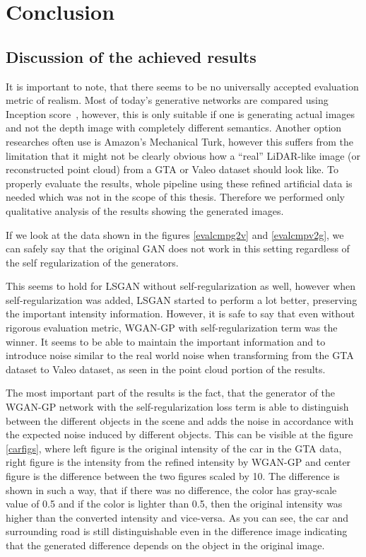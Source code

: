 \chapter{Conclusion}

\section{Discussion of the achieved results}

It is important to note, that there seems to be no universally accepted evaluation metric of realism. Most of today's generative networks are compared using Inception score~\cite{inception}, however, this is only suitable if one is generating actual images and not the depth image with completely different semantics. Another option researches often use is Amazon's Mechanical Turk, however this suffers from the limitation that it might not be clearly obvious how a ``real'' LiDAR-like image (or reconstructed point cloud) from a GTA or Valeo dataset should look like. To properly evaluate the results, whole pipeline using these refined artificial data is needed which was not in the scope of this thesis. Therefore we performed only qualitative analysis of the results showing the generated images.

If we look at the data shown in the figures \ref{evalcmpg2v} and \ref{evalcmpv2g}, we can safely say that the original GAN does not work in this setting regardless of the self regularization of the generators.

This seems to hold for LSGAN without self-regularization as well, however when self-regularization was added, LSGAN started to perform a lot better, preserving the important intensity information. However, it is safe to say that even without rigorous evaluation metric, WGAN-GP with self-regularization term was the winner. It seems to be able to maintain the important information and to introduce noise similar to the real world noise when transforming from the GTA dataset to Valeo dataset, as seen in the point cloud portion of the results.

The most important part of the results is the fact, that the generator of the WGAN-GP network with the self-regularization loss term is able to distinguish between the different objects in the scene and adds the noise in accordance with the expected noise induced by different objects. This can be visible at the figure \ref{carfigs}, where left figure is the original intensity of the car in the GTA data, right figure is the intensity from the refined intensity by WGAN-GP and center figure is the difference between the two figures scaled by 10. The difference is shown in such a way, that if there was no difference, the color has gray-scale value of 0.5 and if the color is lighter than 0.5, then the original intensity was higher than the converted intensity and vice-versa. As you can see, the car and surrounding road is still distinguishable even in the difference image indicating that the generated difference depends on the object in the original image.

